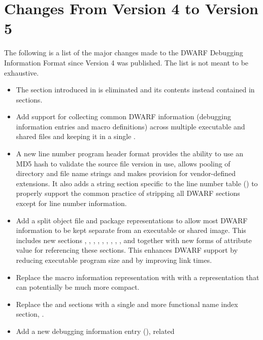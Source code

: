 \bb
\section{Changes From Version 4 to Version 5}
\eb
{}
The following is a list of the major changes made to the DWARF Debugging Information
Format since Version 4 was published. The list is not meant to be exhaustive.
\begin{itemize}
\item The \dotdebugtypes{}
section introduced in \DWARFVersionIV{} 
is eliminated and its contents instead contained in \dotdebuginfo{} sections.
\bb\eb
\item Add support for collecting common DWARF information 
\bb
(debugging information entries 
\eb
and macro definitions)
across multiple executable and shared files and keeping it in a single
.
\item A new line number program header 
\bb
format 
\eb
provides the ability to 
use an MD5 hash to validate 
\bb
the
\eb
source file version in use, allows pooling 
of directory and file name strings and makes provision for vendor-defined
extensions. It also adds a string section specific to the line number table 
(\dotdebuglinestr)
to properly support the common practice of stripping all DWARF sections
except for line number information.
\item Add a split object file and package representations to allow most 
DWARF information to be 
\bb\eb
kept separate from an executable 
or shared image. This includes new sections 
\dotdebugaddr, \dotdebugstroffsets, \dotdebugabbrevdwo, \dotdebuginfodwo, 
\dotdebuglinedwo, \dotdebuglocdwo, \dotdebugmacrodwo, \dotdebugstrdwo,
\dotdebugstroffsetsdwo, \dotdebugcuindex{} and \dotdebugtuindex{} 
together with new forms of attribute value for referencing these sections.
This enhances DWARF support 
\bb
by reducing executable program size and
by improving link times.
\eb
\item Replace the \dotdebugmacinfo{} macro information representation with
\bb
with a \dotdebugmacro{} representation that can potentially be much more compact.
\eb
\item Replace the \dotdebugpubnames{} and \dotdebugpubtypes{} sections
with a single and more functional name index section, \dotdebugnames{}.
\item Add a new debugging information entry (\DWTAGcallsiteNAME), related 

\end{itemize}
